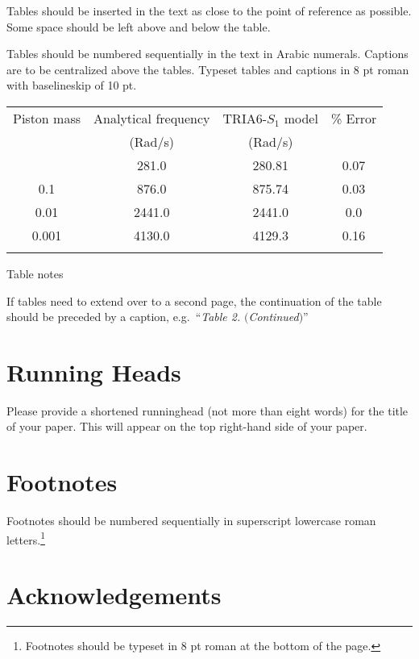 \documentclass{ws-ijcga}
\begin{document}
Tables should be inserted in the text as close to the point of
reference as possible. Some space should be left above and below
the table.

Tables should be numbered sequentially in the text in Arabic
numerals. Captions are to be centralized above the tables.
Typeset tables and captions in 8 pt roman with
baselineskip of 10 pt.

\begin{table}[h]
{\begin{tabular}{@{}cccc@{}} \toprule
Piston mass & Analytical frequency & TRIA6-$S_1$ model &
\% Error \\
& (Rad/s) & (Rad/s) \\ \colrule
1.0\hphantom{00} & \hphantom{0}281.0 & \hphantom{0}280.81 & 0.07 \\
0.1\hphantom{00} & \hphantom{0}876.0 & \hphantom{0}875.74 & 0.03 \\
0.01\hphantom{0} & 2441.0 & 2441.0\hphantom{0} & 0.0\hphantom{0} \\
0.001 & 4130.0 & 4129.3\hphantom{0} & 0.16\\ \botrule
\end{tabular}}
\begin{tabnote}
Table notes
\end{tabnote}
\end{table}

If tables need to extend over to a second page,
the continuation of the table should be preceded by a caption,
e.g.~``{\it Table 2.} $(${\it Continued}$)$''

\section{Running Heads}

Please provide a shortened runninghead (not more than eight words) for
the title of your paper. This will appear on the top right-hand side
of your paper.

\section{Footnotes}

Footnotes should be numbered sequentially in superscript
lowercase roman letters.\footnote{Footnotes should be
typeset in 8 pt roman at the bottom of the page.}

\section*{Acknowledgements}
\end{document}
